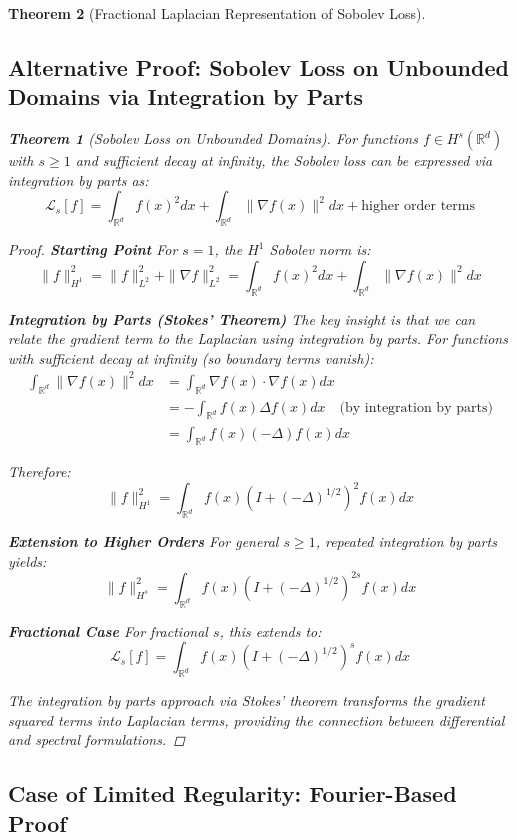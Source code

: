\documentclass{article}
\newtheorem{theorem}{Theorem}[section]
\begin{document}
\begin{theorem}[Fractional Laplacian Representation of Sobolev Loss]
\subsection{Alternative Proof: Sobolev Loss on Unbounded Domains via Integration by Parts}

\begin{theorem}[Sobolev Loss on Unbounded Domains]
For functions $f \in H^s(\mathbb{R}^d)$ with $s \geq 1$ and sufficient decay at infinity, the Sobolev loss can be expressed via integration by parts as:
\[ \mathcal{L}_s[f] = \int_{\mathbb{R}^d} f(x)^2 dx + \int_{\mathbb{R}^d} \|\nabla f(x)\|^2 dx + \text{higher order terms} \]
\end{theorem}

\begin{proof}
\textbf{Starting Point}
For $s = 1$, the $H^1$ Sobolev norm is:
\[ \|f\|_{H^1}^2 = \|f\|_{L^2}^2 + \|\nabla f\|_{L^2}^2 = \int_{\mathbb{R}^d} f(x)^2 dx + \int_{\mathbb{R}^d} \|\nabla f(x)\|^2 dx \]

\textbf{Integration by Parts (Stokes' Theorem)}
The key insight is that we can relate the gradient term to the Laplacian using integration by parts. For functions with sufficient decay at infinity (so boundary terms vanish):
\begin{align}
\int_{\mathbb{R}^d} \|\nabla f(x)\|^2 dx &= \int_{\mathbb{R}^d} \nabla f(x) \cdot \nabla f(x) dx \\
&= -\int_{\mathbb{R}^d} f(x) \Delta f(x) dx \quad \text{(by integration by parts)} \\
&= \int_{\mathbb{R}^d} f(x) (-\Delta) f(x) dx
\end{align}

Therefore:
\[ \|f\|_{H^1}^2 = \int_{\mathbb{R}^d} f(x) (I + (-\Delta)^{1/2})^2 f(x) dx \]

\textbf{Extension to Higher Orders}
For general $s \geq 1$, repeated integration by parts yields:
\[ \|f\|_{H^s}^2 = \int_{\mathbb{R}^d} f(x) (I + (-\Delta)^{1/2})^{2s} f(x) dx \]

\textbf{Fractional Case}
For fractional $s$, this extends to:
\[ \mathcal{L}_s[f] = \int_{\mathbb{R}^d} f(x) (I + (-\Delta)^{1/2})^s f(x) dx \]

The integration by parts approach via Stokes' theorem transforms the gradient squared terms into Laplacian terms, providing the connection between differential and spectral formulations.
\end{proof}

\subsection{Case of Limited Regularity: Fourier-Based Proof}


\end{theorem}
\end{document}
